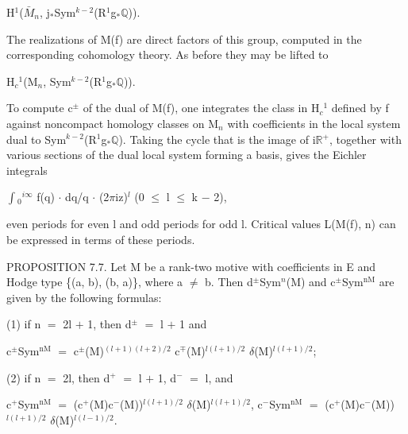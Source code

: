 \documentclass[10pt,twoside]{article}
\begin{document}
H\ensuremath{^{1}}(\ensuremath{\bar{M}}\ensuremath{_{n}}, j\ensuremath{_{*}}Sym\ensuremath{^{k−2}}(R\ensuremath{^{1}}g\ensuremath{_{*}}\ensuremath{ℚ})).\par
The realizations of M(f) are direct factors of this group, computed in the corresponding cohomology theory. As before they may be lifted to\par
H\ensuremath{_{c}}\ensuremath{^{1}}(M\ensuremath{_{n}}, Sym\ensuremath{^{k−2}}(R\ensuremath{^{1}}g\ensuremath{_{*}}\ensuremath{ℚ})).\par
To compute c\ensuremath{^{±}} of the dual of M(f), one integrates the class in H\ensuremath{_{c}}\ensuremath{^{1}} defined by f against noncompact homology classes on M\ensuremath{_{n}} with coefficients in the local system dual to Sym\ensuremath{^{k−2}}(R\ensuremath{^{1}}g\ensuremath{_{*}}\ensuremath{ℚ}). Taking the cycle that is the image of i\ensuremath{ℝ}\ensuremath{^{+}}, together with various sections of the dual local system forming a basis, gives the Eichler integrals\par
\ensuremath{∫}\ensuremath{_{0}}\ensuremath{^{i∞}} f(q) \ensuremath{·} dq/q \ensuremath{·} (2\ensuremath{π}iz)\ensuremath{^{l}}    (0 \ensuremath{≤} l \ensuremath{≤} k \ensuremath{−} 2),\par
even periods for even l and odd periods for odd l. Critical values L(M(f), n) can be expressed in terms of these periods.\par
PROPOSITION 7.7. Let M be a rank-two motive with coefficients in E and Hodge type \{(a, b), (b, a)\}, where a \ensuremath{≠} b. Then d\ensuremath{^{±}}Sym\ensuremath{^{n}}(M) and c\ensuremath{^{±}}Sym\ensuremath{^{\mathrm{nM}}} are given by the following formulas:\par
(1) if n \ensuremath{=} 2l \ensuremath{+} 1, then d\ensuremath{^{±}} \ensuremath{=} l \ensuremath{+} 1 and\par
c\ensuremath{^{±}}Sym\ensuremath{^{\mathrm{nM}}} \ensuremath{=} c\ensuremath{^{±}}(M)\ensuremath{^{(l+1)(l+2)/2}} c\ensuremath{^{∓}}(M)\ensuremath{^{l(l+1)/2}} \ensuremath{δ}(M)\ensuremath{^{l(l+1)/2}};\par
(2) if n \ensuremath{=} 2l, then d\ensuremath{^{+}} \ensuremath{=} l \ensuremath{+} 1, d\ensuremath{^{-}} \ensuremath{=} l, and\par
c\ensuremath{^{+}}Sym\ensuremath{^{\mathrm{nM}}} \ensuremath{=} (c\ensuremath{^{+}}(M)c\ensuremath{^{-}}(M))\ensuremath{^{l(l+1)/2}} \ensuremath{δ}(M)\ensuremath{^{l(l+1)/2}}, c\ensuremath{^{-}}Sym\ensuremath{^{\mathrm{nM}}} \ensuremath{=} (c\ensuremath{^{+}}(M)c\ensuremath{^{-}}(M))\ensuremath{^{l(l+1)/2}} \ensuremath{δ}(M)\ensuremath{^{l(l−1)/2}}.\par
\end{document}
